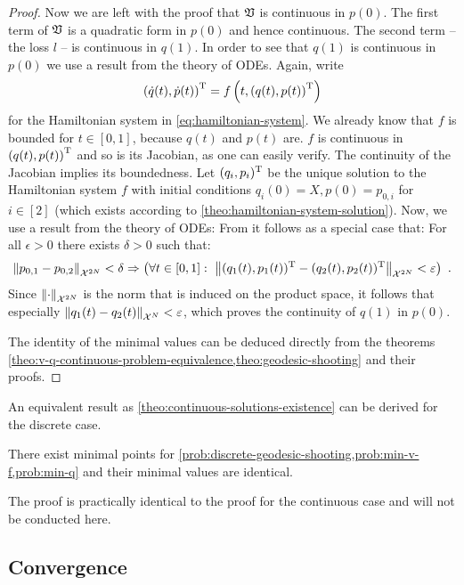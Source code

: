 \begin{proof}
	Now we are left with the proof that $\mathfrak{V}$ is continuous in $p(0)$.
	The first term of $\mathfrak{V}$ is a quadratic form in $p(0)$ and hence continuous.
	The second term -- the loss $l$ -- is continuous in $q(1)$.
	In order to see that $q(1)$ is continuous in $p(0)$ we use a result from the theory of ODEs.
	Again, write
	\begin{equation}
		\left(\dot{q}(t), \dot{p}(t)\right)^{\mathrm{T}} = f\left(t, \left(q(t), p(t)\right)^{\mathrm{T}} \right)
	\end{equation}
	for the Hamiltonian system in \cref{eq:hamiltonian-system}.
	We already know that $f$ is bounded for $t \in [0, 1]$, because $q(t)$ and $p(t)$ are.
	$f$ is continuous in $\left(q(t), p(t)\right)^{\mathrm{T}}$ and so is its Jacobian, as one can easily verify.
	The continuity of the Jacobian implies its boundedness.
	Let $(q_i, p_i)^{\mathrm{T}}$ be the unique solution to the Hamiltonian system $f$ with initial conditions $q_i(0) = X, p(0) = p_{0, i}$ for $i \in [2]$ (which exists according to \cref{theo:hamiltonian-system-solution}).
	Now, we use a result from the theory of ODEs:
	From \cite[Theorem~1.4.1]{arino06} it follows as a special case that:
	For all $\epsilon > 0$ there exists $\delta > 0$ such that:
	\begin{equation}
		\norm{p_{0, 1} - p_{0, 2}}_{\mathcal{X}^{2N}} < \delta \Rightarrow 
		\left(\forall t \in [0, 1]:\ \norm{(q_1(t), p_1(t))^{\mathrm{T}} - (q_2(t), p_2(t))^{\mathrm{T}}}_{\mathcal{X}^{2N}} < \varepsilon \right) \ .
	\end{equation}
	Since $\norm{\cdot}_{\mathcal{X}^{2N}}$ is the norm that is induced on the product space, it follows that especially $\norm{q_1(t) - q_2(t)}_{\mathcal{X}^N} < \varepsilon$, which proves the continuity of $q(1)$ in $p(0)$.
	
	The identity of the minimal values can be deduced directly from the theorems \cref{theo:v-q-continuous-problem-equivalence,theo:geodesic-shooting} and their proofs.
\end{proof}

An equivalent result as \cref{theo:continuous-solutions-existence} can be derived for the discrete case.
\begin{theorem}
	\label{theo:discrete-solutions-existence}
	There exist minimal points for \cref{prob:discrete-geodesic-shooting,prob:min-v-f,prob:min-q} and their minimal values are identical.
\end{theorem}
The proof is practically identical to the proof for the continuous case and will not be conducted here.

\subsection{Convergence}

